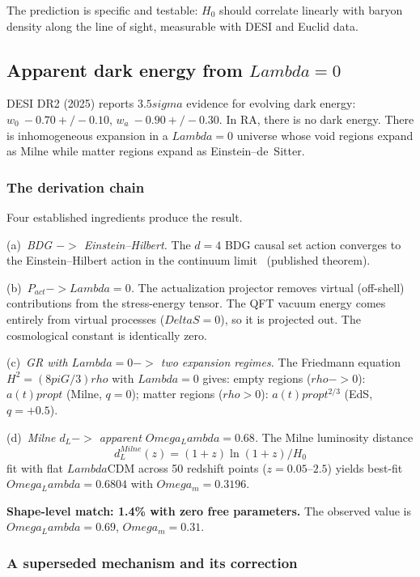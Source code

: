 \documentclass[11pt]{article}
\def\Delta{Delta}%
\def\Lambda{Lambda}%
\def\Omega{Omega}%
\def\rho{rho}%
\def\sigma{sigma}%
\def\pi{pi}%
\def\mathrm#1{#1}%
\def\frac#1#2{#1/#2}%
\def\approx{~}%
\def\to{->}%
\def\propto{prop}%
\def\pm{+/-}%
\begin{document}
The prediction is specific and testable: $H_0$ should correlate linearly with baryon density along the line of sight, measurable with DESI and Euclid data.

\subsection{Apparent dark energy from $\Lambda=0$}
\label{sec:desi}

DESI DR2 (2025) reports $3.5\sigma$ evidence for evolving dark energy: $w_0\approx -0.70\pm 0.10$, $w_a\approx -0.90\pm 0.30$. In RA, there is no dark energy. There is inhomogeneous expansion in a $\Lambda=0$ universe whose void regions expand as Milne while matter regions expand as Einstein--de~Sitter.

\subsubsection{The derivation chain}

Four established ingredients produce the result.

(a)~\emph{BDG $\to$ Einstein--Hilbert.} The $d=4$ BDG causal set action converges to the Einstein--Hilbert action in the continuum limit~\cite{Benincasa2010} (published theorem).

(b)~\emph{$P_{\mathrm{act}}\to\Lambda=0$.} The actualization projector removes virtual (off-shell) contributions from the stress-energy tensor. The QFT vacuum energy comes entirely from virtual processes ($\Delta S=0$), so it is projected out. The cosmological constant is identically zero.

(c)~\emph{GR with $\Lambda=0\to$ two expansion regimes.} The Friedmann equation $H^2=(8\pi G/3)\rho$ with $\Lambda=0$ gives: empty regions ($\rho\to 0$): $a(t)\propto t$ (Milne, $q=0$); matter regions ($\rho>0$): $a(t)\propto t^{2/3}$ (EdS, $q=+0.5$).

(d)~\emph{Milne $d_L\to$ apparent $\Omega_\Lambda=0.68$.} The Milne luminosity distance
\begin{equation}
d_L^{\mathrm{Milne}}(z)=\frac{(1+z)\ln(1+z)}{H_0}
\end{equation}
fit with flat $\Lambda$CDM across 50 redshift points ($z=0.05$--$2.5$) yields best-fit $\Omega_\Lambda=0.6804$ with $\Omega_m=0.3196$.

\textbf{Shape-level match: 1.4\% with zero free parameters.} The observed value is $\Omega_\Lambda=0.69$, $\Omega_m=0.31$.

\subsubsection{A superseded mechanism and its correction}
\end{document}
